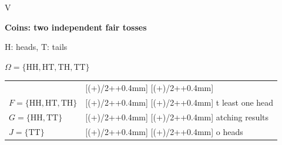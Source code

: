 \documentclass{article}
\newcommand{\DefinitionFont}{\fontsize{13}{15}\selectfont}
\newcommand{\SymbolFont}{\fontsize{14}{16}\selectfont}
\newcommand{\ExampleFont}{\fontsize{12.8}{14.8}\selectfont}
\newcommand{\ExampleLineStretch}{1.12}
\newlength{\RowPadding}
\newcommand{\paddedcell}[1]{\centeredcell{#1}}
\newcommand{\contextcell}[1]{%
  \sbox{\CellContent}{#1}%
  \raisebox{\dimexpr(\dp\CellContent-\ht\CellContent)/2\relax}{\usebox{\CellContent}}}
\newcommand{\centeredcell}[1]{%
  \sbox{\CellContent}{\begin{minipage}[t]{\linewidth}\raggedright #1\end{minipage}}%
  \raisebox{\dimexpr(\dp\CellContent-\ht\CellContent)/2\relax}%
    [\dimexpr(\ht\CellContent+\dp\CellContent)/2+\RowPadding+0.4mm\relax]%
    [\dimexpr(\ht\CellContent+\dp\CellContent)/2+\RowPadding+0.4mm\relax]%
    {\usebox{\CellContent}}%
}
\newcommand{\meaningexplanation}[1]{\textcolor{gray}{\textit{#1}}}
\newcommand{\conceptmeaning}[2]{\begingroup
  #1\par #2\rule[-1pt]{0pt}{1pt}\par
  \endgroup}
\newlength{\ExampleWidth}
\newcommand{\subrowcell}[1]{\begingroup
  \setlength{\RowPadding}{0pt}\centeredcell{#1}\endgroup}
\begin{document}
{\begin{minipage}{\dimexpr\linewidth-2\fboxsep-2\fboxrule\relax}
{\begin{tabular}{V}
  \begin{minipage}[t]{\ExampleWidth}\raggedright
  \textbf{Coins: two independent fair tosses}\par
  $\mathrm H$: heads, $\mathrm T$: tails\par
  $\Omega=\{\mathrm{HH},\mathrm{HT},\mathrm{TH},\mathrm{TT}\}$\par
  \begingroup
  \begin{tabularx}{\linewidth}{@{}>{\collectcell\contextcell}l<{\endcollectcell}>{\collectcell\subrowcell}X<{\endcollectcell}@{}}
  \textbf{Symbol / event set}&\textbf{Meaning}\\
  $F=\{\mathrm{HH},\mathrm{HT},\mathrm{TH}\}$&At least one head\\
  $G=\{\mathrm{HH},\mathrm{TT}\}$&Matching results\\
  $J=\{\mathrm{TT}\}$&No heads
  \end{tabularx}\endgroup
  \end{minipage}
  \end{tabular}}\par
  \end{minipage}}\par
\endgroup
\vspace{0.7mm}
\setlength{\RowPadding}{0.15mm}
\renewcommand{\arraystretch}{1}
\renewcommand{\ExampleLineStretch}{1.02}
\newcommand{\probabilityrow}[5]{%
  \paddedcell{\centering\SymbolFont\ensuremath{\displaystyle #1}}&%
  \paddedcell{\DefinitionFont\conceptmeaning{\if\relax\detokenize{#2}\relax\else#2:\fi}{\meaningexplanation{#3}}}&%
  \paddedcell{\ExampleFont #4}&\paddedcell{\ExampleFont #5}\\\hline}
\end{document}
